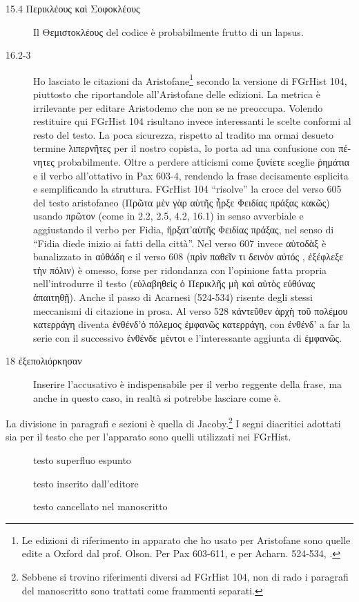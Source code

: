 \begin{description}
\item[15.4 \textgreek{Περικλέους καὶ Σοφοκλέους}] Il \textgreek{Θεμιστοκλέους} del codice è probabilmente frutto di un lapsus.
\item[16.2-3] Ho lasciato le citazioni da Aristofane\footnote{Le edizioni di riferimento in apparato che ho usato per Aristofane sono quelle edite a Oxford dal prof. Olson. Per Pax 603-611, \cite{Olson1998} e per Acharn. 524-534, \cite{Olson2002}.} secondo la versione di FGrHist 104, piuttosto che riportandole all'Aristofane delle edizioni. La metrica è irrilevante per editare Aristodemo che non se ne preoccupa. Volendo restituire qui FGrHist 104 risultano invece interessanti le scelte conformi al resto del testo. La poca sicurezza, rispetto al tradito ma ormai desueto termine \textgreek{λιπερνῆτες} per il nostro copista, lo porta ad una confusione con \textgreek{πένητες} probabilmente. Oltre a perdere atticismi come \textgreek{ξυνίετε} sceglie \textgreek{ῥημάτια} e il verbo all'ottativo in Pax 603-4, rendendo la frase decisamente esplicita e semplificando la struttura. FGrHist 104 “risolve” la croce del verso 605 del testo aristofaneo (\textgreek{Πρῶτα μὲν γὰρ \crux αὐτῆς ἦρξε \crux  Φειδίας πράξας κακῶς}) usando \textgreek{πρῶτον} (come in 2.2, 2.5, 4.2, 16.1) in senso avverbiale e aggiustando il verbo per Fidia, \textgreek{ἤρξατ’αὐτῆς Φειδίας πράξας}, nel senso di “Fidia diede inizio ai fatti della città”. Nel verso 607 invece \textgreek{αὐτοδὰξ} è banalizzato in \textgreek{αὐθάδη} e il verso 608 (\textgreek{πρὶν παθεῖν τι δεινὸν αὐτός , ἐξέφλεξε τὴν πόλιν}) è omesso, forse per ridondanza con l'opinione fatta propria nell'introdurre il testo (\textgreek{εὐλαβηθεὶς ὁ Περικλῆς μὴ καὶ αὐτὸς εὐθύνας ἀπαιτηθῇ}). Anche il passo di Acarnesi (524-534) risente degli stessi meccanismi di citazione in prosa. Al verso 528 \textgreek{κἀντεῦθεν ἁρχὴ τοῦ πολέμου κατερράγη} diventa \textgreek{ἐνθένδ’ὁ πόλεμος ἐμφανῶς κατερράγη}, con \textgreek{ἐνθένδ’} a far la serie con il successivo \textgreek{ἐνθένδε μέντοι} e l'interessante aggiunta di \textgreek{ἐμφανῶς}. 
\item[18 \textgreek{ἐξεπολιόρκησαν }] Inserire l'accusativo è indispensabile per il verbo reggente della frase, ma anche in questo caso, in realtà si potrebbe lasciare come è.
\end{description}

\clearpage
La divisione in paragrafi e sezioni è quella di Jacoby.\footnote{Sebbene si trovino riferimenti diversi ad FGrHist 104, non di rado i paragrafi del manoscritto sono trattati come frammenti separati.} I segni diacritici adottati sia per il testo che per l'apparato sono quelli utilizzati nei FGrHist.
\begin{description}
\item[\Ladd{ }] testo superfluo espunto
\item[\ladd{ }] testo inserito dall'editore
\item[\lladd{ }] testo cancellato nel manoscritto
\end{description}





